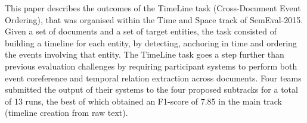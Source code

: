 This paper describes the outcomes of the TimeLine task (Cross-Document Event Ordering), that was organised within the Time and Space track of SemEval-2015. Given a set of documents and a set of target entities, the task consisted of building a timeline for each entity, by detecting, anchoring in time and ordering the events involving that entity. The TimeLine task goes a step further than previous evaluation challenges by requiring participant systems to perform both event coreference and temporal relation extraction across documents. Four teams submitted the output of their systems to the four proposed subtracks for a total of 13 runs, the best of which obtained an F1-score of 7.85 in the main track (timeline creation from raw text).
